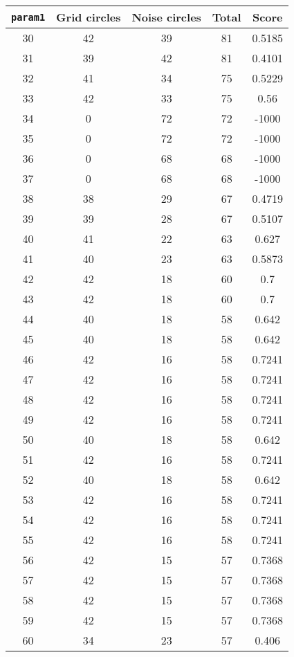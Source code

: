\documentclass[letterpaper, 12pt]{article}
\begin{document}
\begin{longtable}{|c|c|c|c|c|}
\hline
\textbf{\texttt{param1}} & \textbf{Grid circles} & \textbf{Noise circles} & \textbf{Total} & \textbf{Score} \\
\hline
30 & 42 & 39 & 81 & 0.5185 \\
\hline
31 & 39 & 42 & 81 & 0.4101 \\
\hline
32 & 41 & 34 & 75 & 0.5229 \\
\hline
33 & 42 & 33 & 75 & 0.56 \\
\hline
34 & 0 & 72 & 72 & -1000 \\
\hline
35 & 0 & 72 & 72 & -1000 \\
\hline
36 & 0 & 68 & 68 & -1000 \\
\hline
37 & 0 & 68 & 68 & -1000 \\
\hline
38 & 38 & 29 & 67 & 0.4719 \\
\hline
39 & 39 & 28 & 67 & 0.5107 \\
\hline
40 & 41 & 22 & 63 & 0.627 \\
\hline
41 & 40 & 23 & 63 & 0.5873 \\
\hline
42 & 42 & 18 & 60 & 0.7 \\
\hline
43 & 42 & 18 & 60 & 0.7 \\
\hline
44 & 40 & 18 & 58 & 0.642 \\
\hline
45 & 40 & 18 & 58 & 0.642 \\
\hline
46 & 42 & 16 & 58 & 0.7241 \\
\hline
47 & 42 & 16 & 58 & 0.7241 \\
\hline
48 & 42 & 16 & 58 & 0.7241 \\
\hline
49 & 42 & 16 & 58 & 0.7241 \\
\hline
50 & 40 & 18 & 58 & 0.642 \\
\hline
51 & 42 & 16 & 58 & 0.7241 \\
\hline
52 & 40 & 18 & 58 & 0.642 \\
\hline
53 & 42 & 16 & 58 & 0.7241 \\
\hline
54 & 42 & 16 & 58 & 0.7241 \\
\hline
55 & 42 & 16 & 58 & 0.7241 \\
\hline
56 & 42 & 15 & 57 & 0.7368 \\
\hline
57 & 42 & 15 & 57 & 0.7368 \\
\hline
58 & 42 & 15 & 57 & 0.7368 \\
\hline
59 & 42 & 15 & 57 & 0.7368 \\
\hline
60 & 34 & 23 & 57 & 0.406 \\
\hline

\end{longtable}
\end{document}
